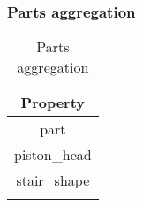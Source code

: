 \subsubsection{Parts aggregation}\label{spigot-types:parts}

\begin{longtable}{ |c| }
\hline
Property \\
\hline
\endhead
part \\
piston\_head \\
stair\_shape \\
\hline
\caption{Parts aggregation}
\end{longtable}

%
%
%
%
